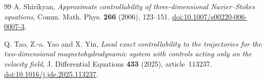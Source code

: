 \documentclass[11pt,a4paper]{amsart}
\theoremstyle{definition}
\theoremstyle{remark}
\numberwithin{equation}{section}
\begin{document}
\begin{thebibliography}{99}
A. Shirikyan,
\emph{Approximate controllability of three-dimensional Navier--Stokes equations},
Comm. Math. Phys. \textbf{266} (2006), 123--151.
\href{https://doi.org/10.1007/s00220-006-0007-3}{doi:10.1007/s00220-006-0007-3}.

Q. Tao, Z.-a. Yao and X. Yin,
\emph{Local exact controllability to the trajectories for the two-dimensional magnetohydrodynamic system with controls acting only on the velocity field},
J. Differential Equations \textbf{433} (2025), article~113237.
\href{https://doi.org/10.1016/j.jde.2025.113237}{doi:10.1016/j.jde.2025.113237}.
\end{thebibliography}
\end{document}
